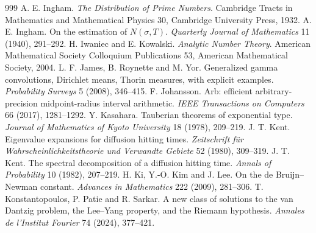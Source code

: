 \begin{thebibliography}{999}
 A. E. Ingham. \emph{The Distribution of Prime Numbers}. Cambridge Tracts in Mathematics and Mathematical Physics 30, Cambridge University Press, 1932.
 A. E. Ingham. On the estimation of $N(\sigma,T)$. \emph{Quarterly Journal of Mathematics} 11 (1940), 291--292.
 H. Iwaniec and E. Kowalski. \emph{Analytic Number Theory}. American Mathematical Society Colloquium Publications 53, American Mathematical Society, 2004.
 L. F. James, B. Roynette and M. Yor. Generalized gamma convolutions, Dirichlet means, Thorin measures, with explicit examples. \emph{Probability Surveys} 5 (2008), 346--415.
 F. Johansson. Arb: efficient arbitrary-precision midpoint-radius interval arithmetic. \emph{IEEE Transactions on Computers} 66 (2017), 1281--1292.
 Y. Kasahara. Tauberian theorems of exponential type. \emph{Journal of Mathematics of Kyoto University} 18 (1978), 209--219.
 J. T. Kent. Eigenvalue expansions for diffusion hitting times. \emph{Zeitschrift f\"ur Wahrscheinlichkeitstheorie und Verwandte Gebiete} 52 (1980), 309--319.
 J. T. Kent. The spectral decomposition of a diffusion hitting time. \emph{Annals of Probability} 10 (1982), 207--219.
 H. Ki, Y.-O. Kim and J. Lee. On the de Bruijn--Newman constant. \emph{Advances in Mathematics} 222 (2009), 281--306.
 T. Konstantopoulos, P. Patie and R. Sarkar. A new class of solutions to the van Dantzig problem, the Lee--Yang property, and the Riemann hypothesis. \emph{Annales de l'Institut Fourier} 74 (2024), 377--421.

\end{thebibliography}
